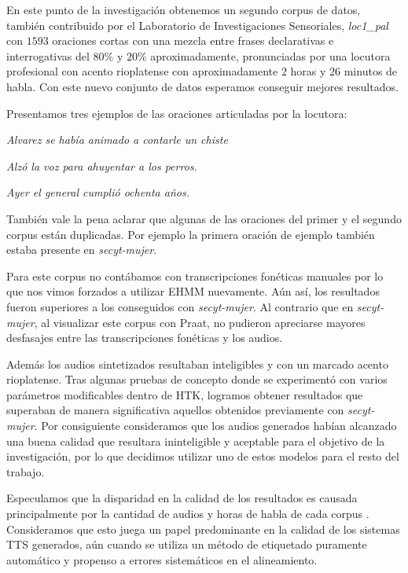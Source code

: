 En este punto de la investigación obtenemos un segundo corpus de datos, también contribuido por el Laboratorio de Investigaciones Sensoriales, \textit{loc1\_pal} \cite{loc1pal} con $1593$ oraciones cortas con una mezcla entre frases declarativas e interrogativas del $80\%$ y $20\%$ aproximadamente, pronunciadas por una locutora profesional con acento rioplatense con aproximadamente $2$ horas y $26$ minutos de habla. Con este nuevo conjunto de datos esperamos conseguir mejores resultados.

Presentamos tres ejemplos de las oraciones articuladas por la locutora:

\indent\indent \textit{Alvarez se había animado a contarle un chiste}

\indent\indent \textit{Alzó la voz para ahuyentar a los perros.}

\indent\indent \textit{Ayer el general cumplió ochenta años.}

También vale la pena aclarar que algunas de las oraciones del primer y el segundo corpus están duplicadas. Por ejemplo la primera oración de ejemplo también estaba presente en \textit{secyt-mujer}.

Para este corpus no contábamos con transcripciones fonéticas manuales por lo que nos vimos forzados a utilizar EHMM nuevamente. Aún así, los resultados fueron superiores a los conseguidos con \textit{secyt-mujer}. Al contrario que en \textit{secyt-mujer}, al visualizar este corpus con Praat, no pudieron apreciarse mayores desfasajes entre las transcripciones fonéticas y los audios.

Además los audios sintetizados resultaban inteligibles y con un marcado acento rioplatense. Tras algunas pruebas de concepto donde se experimentó con varios parámetros modificables dentro de HTK, logramos obtener resultados que superaban de manera significativa aquellos obtenidos previamente con \textit{secyt-mujer}. Por consiguiente consideramos que los audios generados habían alcanzado una buena calidad que resultara ininteligible y aceptable para el objetivo de la investigación, por lo que decidimos utilizar uno de estos modelos para el resto del trabajo.


Especulamos que la disparidad en la calidad de los resultados es causada principalmente por la cantidad de audios y horas de habla de cada corpus \cite{whyItSucked}. Consideramos que esto juega un papel predominante en la calidad de los sistemas TTS generados, aún cuando se utiliza un método de etiquetado puramente automático y propenso a errores sistemáticos en el alineamiento.

